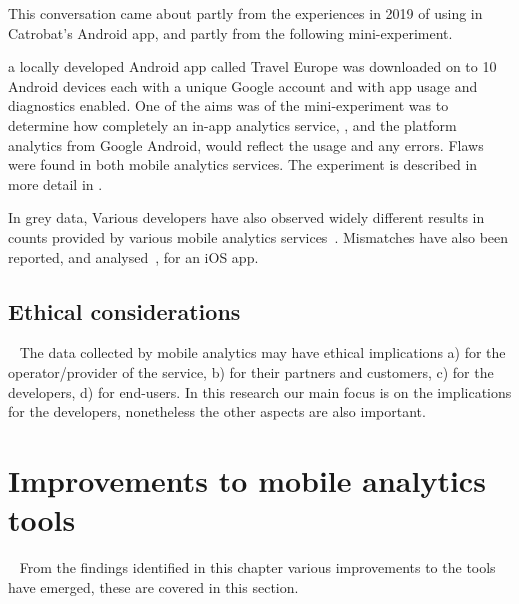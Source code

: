 This conversation came about partly from the experiences in 2019 of using  in Catrobat's  Android app, and partly from the following mini-experiment. 

a locally developed Android app called Travel Europe was downloaded on to 10 Android devices each with a unique Google account and with app usage and diagnostics enabled. One of the aims was of the mini-experiment was to determine how completely an in-app analytics service, , and the platform analytics from Google Android, would reflect the usage and any errors. Flaws were found in both mobile analytics services. The experiment is described in more detail in .

In grey data, Various developers have also observed widely different results in counts provided by various mobile analytics services~. Mismatches have also been reported, and analysed~, for an iOS app. %


\subsection{Ethical considerations}~\label{tata-ethical-considerations-topic}
The data collected by mobile analytics may have ethical implications a) for the operator/provider of the service, b) for their partners and customers, c) for the developers, d) for end-users. In this research our main focus is on the implications for the developers, nonetheless the other aspects are also important.


\section{Improvements to mobile analytics tools}~\label{tata-itools-section}\index{\itools}
From the findings identified in this chapter various improvements to the tools have emerged, these are covered in this section.

